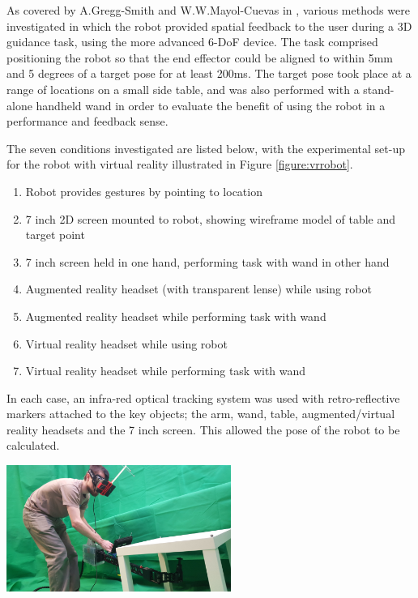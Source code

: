 \documentclass[11pt]{article}
\begin{document}
As covered by A.Gregg-Smith and W.W.Mayol-Cuevas in \cite{GreggSmithFeedback}, various methods were investigated in which the robot provided spatial feedback to the user during a 3D guidance task, using the more advanced 6-DoF device. The task comprised positioning the robot so that the end effector could be aligned to within 5mm and 5 degrees of a target pose for at least 200ms. The target pose took place at a range of locations on a small side table, and was also performed with a stand-alone handheld wand in order to evaluate the benefit of using the robot in a performance and feedback sense.

The seven conditions investigated are listed below, with the experimental set-up for the robot with virtual reality illustrated in Figure \ref{figure:vrrobot}.
\begin{enumerate}
\item{Robot provides gestures by pointing to location}
\item{7 inch 2D screen mounted to robot, showing wireframe model of table and target point}
\item{7 inch screen held in one hand, performing task with wand in other hand}
\item{Augmented reality headset (with transparent lense) while using robot}
\item{Augmented reality headset while performing task with wand}
\item{Virtual reality headset while using robot}
\item{Virtual reality headset while performing task with wand}
\end{enumerate}

In each case, an infra-red optical tracking system was used with retro-reflective markers attached to the key objects; the arm, wand, table, augmented/virtual reality headsets and the 7 inch screen. This allowed the pose of the robot to be calculated.

\begin{center}
\includegraphics[width=0.55\textwidth]{vrrobot.png}
\label{figure:vrrobot}
\end{center} 
 
\end{document}
